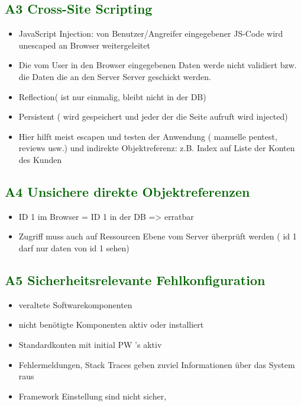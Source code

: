 \subsection*{\textcolor{darkgreen}{A3 Cross-Site Scripting}}

	\begin{itemize}
	\item JavaScript Injection: von Benutzer/Angreifer eingegebener JS-Code wird unescaped an Browser weitergeleitet
	\item Die vom User in den Browser eingegebenen Daten werde nicht validiert bzw. die Daten die an den Server
	Server geschickt werden. 
	\item Reflection( ist nur einmalig, bleibt nicht in der DB) 
	\item Persistent ( wird gespeichert und jeder der die Seite aufruft wird injected)
\item Hier hilft meist escapen und testen der Anwendung ( manuelle pentest, reviews usw.) und indirekte Objektreferenz: z.B. Index auf Liste der Konten des Kunden
	\end{itemize}
\subsection*{\textcolor{darkgreen}{A4 Unsichere direkte Objektreferenzen}}

	\begin{itemize}
	\item ID 1 im Browser = ID 1 in der DB => erratbar
	\item Zugriff muss auch auf Ressourcen Ebene vom Server überprüft werden ( id 1 darf nur daten von id 1 sehen)
	\end{itemize}



\subsection*{\textcolor{darkgreen}{A5 Sicherheitsrelevante Fehlkonfiguration}}

	\begin{itemize}
	\item veraltete Softwarekomponenten
	\item nicht benötigte Komponenten aktiv oder installiert
	\item Standardkonten mit initial PW\'{ '}s aktiv 
	\item Fehlermeldungen, Stack Traces geben zuviel Informationen über das System raus
	\item Framework Einstellung sind nicht sicher,
	\end{itemize}

